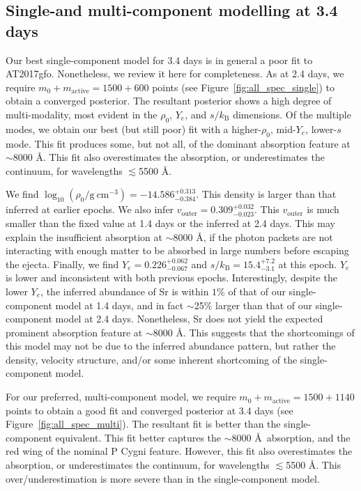 \documentclass[twocolumn,twocolappendix]{aastex63}
\begin{document}
\subsection{Single-and multi-component modelling at 3.4 days}\label{ssc:3.4}

Our best single-component model for 3.4 days is in general a poor fit to AT2017gfo. Nonetheless, we review it here for completeness. As at 2.4 days, we require $m_0 + m_{\mathrm{active}} = 1500 + 600$ points (see Figure~\ref{fig:all_spec_single}) to obtain a converged posterior. The resultant posterior shows a high degree of multi-modality, most evident in the $\rho_0$, $Y_e$, and $s / k_{\mathrm{B}}$ dimensions. Of the multiple modes, we obtain our best (but still poor) fit with a higher-$\rho_0$, mid-$Y_e$, lower-$s$ mode. This fit produces some, but not all, of the dominant absorption feature at $\sim$8000 \AA. This fit also overestimates the absorption, or underestimates the continuum, for wavelengths $\lesssim$5500 \AA. 

We find $\log_{10} (\rho_0 / \mathrm{g~cm^{-3}}) = -14.586^{+0.313}_{-0.384}$. This density is larger than that inferred at earlier epochs. We also infer $v_{\mathrm{outer}} = 0.309^{+0.032}_{-0.023}$. This $v_{\mathrm{outer}}$ is much smaller than the fixed value at 1.4 days or the inferred at 2.4 days. This may explain the insufficient absorption at $\sim$8000 \AA, if the photon packets are not interacting with enough matter to be absorbed in large numbers before escaping the ejecta. Finally, we find $Y_e = 0.226^{+0.062}_{-0.067}$ and $s/k_{\mathrm{B}} = 15.4^{+7.2}_{-3.1}$ at this epoch. $Y_e$ is lower and inconsistent with both previous epochs. Interestingly, despite the lower $Y_e$, the inferred abundance of Sr is within $1$\% of that of our single-component model at 1.4 days, and in fact $\sim$25\% larger than that of our single-component model at 2.4 days. Nonetheless, Sr does not yield the expected prominent absorption feature at $\sim$8000 \AA. This suggests that the shortcomings of this model may not be due to the inferred abundance pattern, but rather the density, velocity structure, and/or some inherent shortcoming of the single-component model.

For our preferred, multi-component model, we require $m_0 + m_{\mathrm{active}} = 1500 + 1140$ points to obtain a good fit and converged posterior at 3.4 days (see Figure~\ref{fig:all_spec_multi}). The resultant fit is better than the single-component equivalent. This fit better captures the $\sim$8000 \AA~absorption, and the red wing of the nominal P Cygni feature. However, this fit also overestimates the absorption, or underestimates the continuum, for wavelengths $\lesssim$5500 \AA. This over/underestimation is more severe than in the single-component model.
\end{document}
